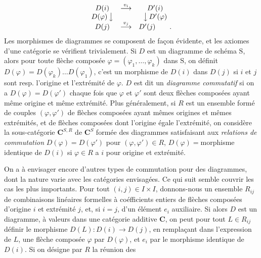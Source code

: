 \[
\begin{array}{ccc}
D(i) & \stackrel{v_i}{\longrightarrow} & D'(i) \\
{D(\varphi)}\,\big\downarrow &&
  \big\downarrow\,{D'(\varphi)} \\
D(j) & \stackrel{v_j}{\longrightarrow} & D'(j)\qquad .
\end{array}
\]
Les morphismes de diagrammes se composent de façon évidente, et les axiomes
d'une catégorie se vérifient trivialement.
Si $D$ est un diagramme de schéma $\mathrm{S}$, alors pour toute flèche composée
$\varphi=(\varphi_1,\ldots,\varphi_k)$ dans $\mathrm{S}$, on définit
$D(\varphi)=D(\varphi_k)\ldots D(\varphi_1)$, c'est un morphisme de $D(i)$
dans $D(j)$ si $i$ et $j$ sont resp. l'origine et l'extrémité de $\varphi$.
$D$ est dit un \textit{diagramme commutatif} si on a
$D(\varphi)=D(\varphi')$ chaque fois que $\varphi$ et $\varphi'$ sont deux
flèches composées ayant même origine et même extrémité.
Plus généralement, si $R$ est un ensemble formé de couples
$(\varphi,\varphi')$ de flèches composées ayant mêmes origines et mêmes
extrémités, et de flèches composées dont l'origine égale l'extrémité, on
considère la sous-catégorie $\mathbf{C}^{S,R}$ de $\mathbf{C}^S$ formée des diagrammes
satisfaisant aux \textit{relations de commutation}
$D(\varphi)=D(\varphi')$ pour $(\varphi,\varphi')\in R$,
$D(\varphi)={}$morphisme identique de $D(i)$ si $\varphi\in R$ a $i$ pour
origine et extrémité.

On a à envisager encore d'autres types de commutation pour des diagrammes,
dont la nature varie avec les catégories envisagées. Ce qui suit semble
couvrir les cas les plus importants. Pour tout $(i,j)\in I\times I$,
donnons-nous un ensemble $R_{ij}$ de combinaisons linéaires formelles à
coéfficients entiers de flèches composées d'origine $i$ et extrémité $j$, et,
si $i=j$, d'un élément $e_i$ auxiliaire. Si alors $D$ est un diagramme, à
valeurs dans une catégorie additive $\mathbf{C}$, on peut pour tout $L\in R_{ij}$
définir le morphisme $D(L):D(i)\to D(j)$, en remplaçant dans
l'expression de $L$, une flèche composée $\varphi$ par $D(\varphi)$, et $e_i$
par le morphisme identique de $D(i)$. Si on désigne par $R$ la réunion des

